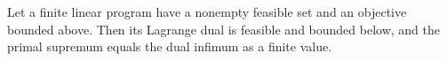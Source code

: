 Let a finite linear program have a nonempty feasible set and an objective bounded above. Then its Lagrange dual is feasible and bounded below, and the primal supremum equals the dual infimum as a finite value.

